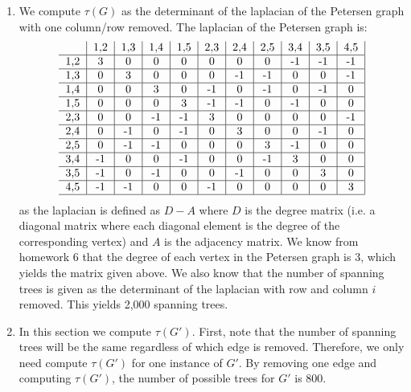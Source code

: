 \documentclass{article}
\begin{document}
\begin{enumerate}
	\item We compute $\tau(G)$ as the determinant of the laplacian of the Petersen graph with one column/row removed. The laplacian of the Petersen graph is:
		\begin{equation*}
			\begin{tabular}{c | c | c | c | c |c | c | c | c | c | c |}
				   & 1,2 & 1,3 & 1,4 & 1,5 & 2,3 & 2,4 & 2,5 & 3,4 & 3,5 & 4,5 \\ \hline 
				1,2& 3   & 0   & 0   & 0   & 0   & 0   & 0   & -1   & -1   & -1   \\ \hline
				1,3& 0   & 3   & 0   & 0   & 0   & -1   & -1   & 0   & 0   & -1   \\ \hline
				1,4& 0   & 0   & 3   & 0   & -1   & 0   & -1   & 0   & -1   & 0   \\ \hline
				1,5& 0   & 0   & 0   & 3   & -1   & -1   & 0   & -1   & 0   & 0   \\ \hline
				2,3& 0   & 0   & -1   & -1   & 3   & 0   & 0   & 0   & 0   & -1   \\ \hline
				2,4& 0   & -1   & 0   & -1   & 0   & 3   & 0   & 0   & -1   & 0   \\ \hline
				2,5& 0   & -1   & -1   & 0   & 0   & 0   & 3   & -1   & 0   & 0   \\ \hline
				3,4& -1   & 0   & 0   & -1   & 0   & 0   & -1   & 3   & 0   & 0   \\ \hline
				3,5& -1   & 0   & -1   & 0   & 0   & -1   & 0   & 0   & 3   & 0   \\ \hline
				4,5& -1   & -1   & 0   & 0   & -1   & 0   & 0   & 0   & 0   & 3   \\ \hline
			\end{tabular}
		\end{equation*}
		as the laplacian is defined as $D - A$ where $D$ is the degree matrix (i.e. a diagonal matrix where each diagonal element is the degree of the corresponding vertex) and $A$ is the adjacency matrix.  We know from homework 6 that the degree of each vertex in the Petersen graph is $3$, which yields the matrix given above. We also know that the number of spanning trees is given as the determinant of the laplacian with row and column $i$ removed.  This yields 2,000 spanning trees.
	\item In this section we compute $\tau(G')$. First, note that the number of spanning trees will be the same regardless of which edge is removed. Therefore, we only need compute $\tau(G')$ for one instance of $G'$. By removing one edge and computing $\tau(G')$, the number of possible trees for $G'$ is 800.

\end{enumerate}
\end{document}
